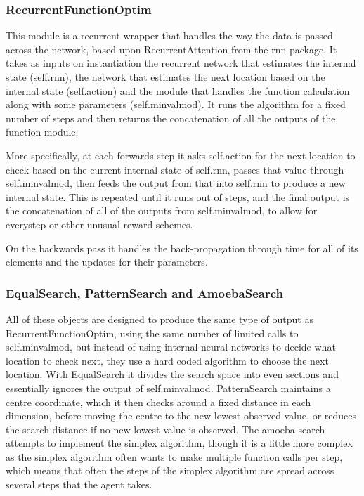 \subsubsection{RecurrentFunctionOptim}
This module is a recurrent wrapper that handles the way the data is passed across the network, based upon RecurrentAttention from the rnn package. It takes as inputs on instantiation the recurrent network that estimates the internal state (self.rnn), the network that estimates the next location based on the internal state (self.action) and the module that handles the function calculation along with some parameters (self.minvalmod). It runs the algorithm for a fixed number of steps and then returns the concatenation of all the outputs of the function module.

More specifically, at each forwards step it asks self.action for the next location to check based on the current internal state of self.rnn, passes that value through self.minvalmod, then feeds the output from that into self.rnn to produce a new internal state. This is repeated until it runs out of steps, and the final output is the concatenation of all of the outputs from self.minvalmod, to allow for everystep or other unusual reward schemes.

On the backwards pass it handles the back-propagation through time for all of its elements and the updates for their parameters.

\subsubsection{EqualSearch, PatternSearch and AmoebaSearch}
All of these objects are designed to produce the same type of output as RecurrentFunctionOptim, using the same number of limited calls to self.minvalmod, but instead of using internal neural networks to decide what location to check next, they use a hard coded algorithm to choose the next location. With EqualSearch it divides the search space into even sections and essentially ignores the output of self.minvalmod. PatternSearch maintains a centre coordinate, which it then checks around a fixed distance in each dimension, before moving  the centre to the new lowest observed value, or reduces the search distance if no new lowest value is observed. The amoeba search attempts to implement the simplex algorithm, though it is a little more complex as the simplex algorithm often wants to make multiple function calls per step, which means that often the steps of the simplex algorithm are spread across several steps that the agent takes.


